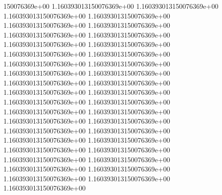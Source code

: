150076369e+00	1.160393013150076369e+00	1.160393013150076369e+00	1.160393013150076369e+00	1.160393013150076369e+00	1.160393013150076369e+00	1.160393013150076369e+00	1.160393013150076369e+00	1.160393013150076369e+00	1.160393013150076369e+00	1.160393013150076369e+00	1.160393013150076369e+00	1.160393013150076369e+00	1.160393013150076369e+00	1.160393013150076369e+00	1.160393013150076369e+00	1.160393013150076369e+00	1.160393013150076369e+00	1.160393013150076369e+00	1.160393013150076369e+00	1.160393013150076369e+00	1.160393013150076369e+00	1.160393013150076369e+00	1.160393013150076369e+00	1.160393013150076369e+00	1.160393013150076369e+00	1.160393013150076369e+00	1.160393013150076369e+00	1.160393013150076369e+00	1.160393013150076369e+00	1.160393013150076369e+00	1.160393013150076369e+00	1.160393013150076369e+00	1.160393013150076369e+00	1.160393013150076369e+00	1.160393013150076369e+00	1.160393013150076369e+00	1.160393013150076369e+00	1.160393013150076369e+00	1.160393013150076369e+00
